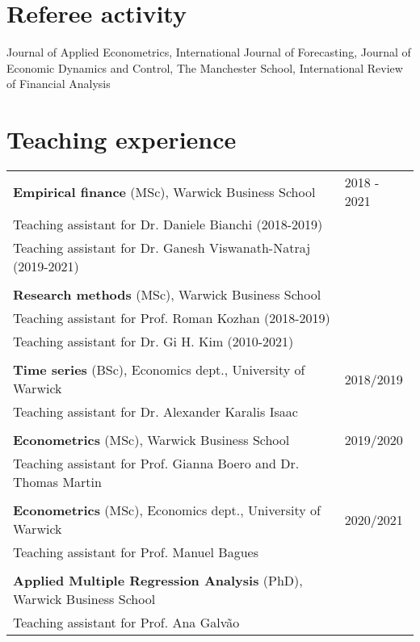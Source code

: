\documentclass[a4paper,12pt]{article}
\begin{document}
\section{Referee activity}
Journal of Applied Econometrics, International Journal of Forecasting, Journal of Economic Dynamics and Control, The Manchester School, International Review of Financial Analysis

\section{Teaching experience}
\begin{tabular*}{\linewidth}{@{}l@{\extracolsep{\fill}}l}
\textbf{Empirical finance} (MSc), Warwick Business School & 2018 - 2021\\[.25em]
\multicolumn{1}{l}{Teaching assistant for Dr. Daniele Bianchi (2018-2019)}\\
\multicolumn{1}{l}{Teaching assistant for Dr. Ganesh Viswanath-Natraj (2019-2021)}\\
\\[.25em]
\textbf{Research methods} (MSc), Warwick Business School \\[.25em]
\multicolumn{1}{l}{Teaching assistant for Prof. Roman Kozhan (2018-2019)}\\
\multicolumn{1}{l}{Teaching assistant for Dr. Gi H. Kim (2010-2021)}\\
\\[.25em]
\textbf{Time series} (BSc), Economics dept., University of Warwick & 2018/2019 \\[.25em]
\multicolumn{1}{l}{Teaching assistant for Dr. Alexander Karalis Isaac} \\
\\[.25em]
\textbf{Econometrics} (MSc), Warwick Business School & 2019/2020\\[.25em]
\multicolumn{1}{l}{Teaching assistant for Prof. Gianna Boero and Dr. Thomas Martin }\\
\\[.25em]
\textbf{Econometrics} (MSc), Economics dept.,  University of Warwick & 2020/2021\\[.25em]
\multicolumn{1}{l}{Teaching assistant for Prof. Manuel Bagues}\\
\\[.25em]
\textbf{Applied Multiple Regression Analysis} (PhD), Warwick Business School \\[.25em]
\multicolumn{1}{l}{Teaching assistant for Prof. Ana Galv\~ao}\\
\end{tabular*}
\end{document}
